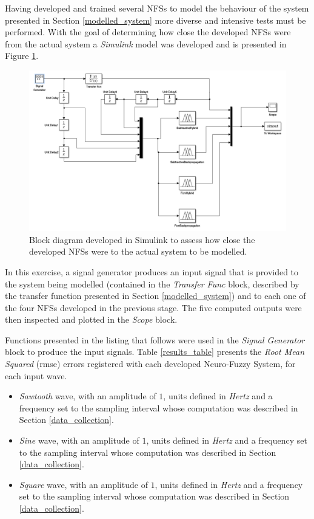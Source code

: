 \documentclass[11pt]{article}
\begin{document}
Having developed and trained several NFSs to model the behaviour of the system presented in Section \ref{modelled_system} more diverse and intensive tests must be performed. With the goal of determining how close the developed NFSs were from the actual system a \emph{Simulink} model was developed and is presented in Figure \ref{assessment_simulink}.

\begin{figure}[ht]
	\centering
	\includegraphics[scale=0.4]{images/assessment_simulink.png}
	\caption{Block diagram developed in Simulink to assess how close the developed NFSs were to the actual system to be modelled.}
	\label{assessment_simulink}
\end{figure}

In this exercise, a signal generator produces an input signal that is provided to the system being modelled (contained in the \emph{Transfer Func} block, described by the transfer function presented in Section \ref{modelled_system}) and to each one of the four NFSs developed in the previous stage. The five computed outputs were then inspected and plotted in the \emph{Scope} block.

Functions presented in the listing that follows were used in the \emph{Signal Generator} block to produce the input signals. Table \ref{results_table} presents the \emph{Root Mean Squared} (rmse) errors registered with each developed Neuro-Fuzzy System, for each input wave.

\begin{itemize}
	\item \emph{Sawtooth} wave, with an amplitude of $1$, units defined in \emph{Hertz} and a frequency set to the sampling interval whose computation was described in Section \ref{data_collection}.
		
	\item \emph{Sine} wave, with an amplitude of $1$, units defined in \emph{Hertz} and a frequency set to the sampling interval whose computation was described in Section \ref{data_collection}.
	
	\item \emph{Square} wave, with an amplitude of $1$, units defined in \emph{Hertz} and a frequency set to the sampling interval whose computation was described in Section \ref{data_collection}. 
\end{itemize}
\end{document}
